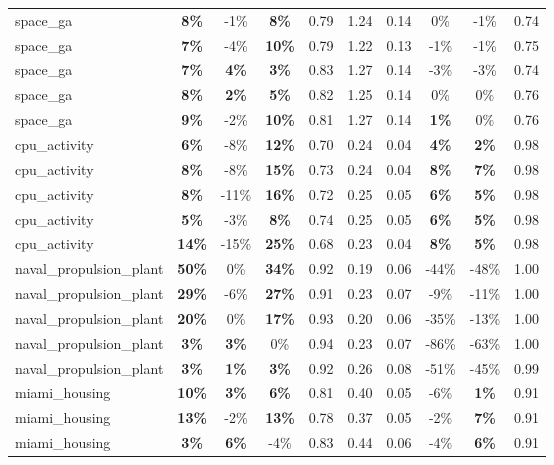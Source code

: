 \begin{table}[!htbp]
\begin{small}
\begin{sc}
{\begin{tabular}{lccccccccc}
space\_ga & \textbf{8\%} & -1\% & \textbf{8\%} & 0.79 & 1.24 & 0.14 & 0\% & -1\% & 0.74 \\
space\_ga & \textbf{7\%} & -4\% & \textbf{10\%} & 0.79 & 1.22 & 0.13 & -1\% & -1\% & 0.75 \\
space\_ga & \textbf{7\%} & \textbf{4\%} & \textbf{3\%} & 0.83 & 1.27 & 0.14 & -3\% & -3\% & 0.74 \\
space\_ga & \textbf{8\%} & \textbf{2\%} & \textbf{5\%} & 0.82 & 1.25 & 0.14 & 0\% & 0\% & 0.76 \\
space\_ga & \textbf{9\%} & -2\% & \textbf{10\%} & 0.81 & 1.27 & 0.14 & \textbf{1\%} & 0\% & 0.76 \\
cpu\_activity & \textbf{6\%} & -8\% & \textbf{12\%} & 0.70 & 0.24 & 0.04 & \textbf{4\%} & \textbf{2\%} & 0.98 \\
cpu\_activity & \textbf{8\%} & -8\% & \textbf{15\%} & 0.73 & 0.24 & 0.04 & \textbf{8\%} & \textbf{7\%} & 0.98 \\
cpu\_activity & \textbf{8\%} & -11\% & \textbf{16\%} & 0.72 & 0.25 & 0.05 & \textbf{6\%} & \textbf{5\%} & 0.98 \\
cpu\_activity & \textbf{5\%} & -3\% & \textbf{8\%} & 0.74 & 0.25 & 0.05 & \textbf{6\%} & \textbf{5\%} & 0.98 \\
cpu\_activity & \textbf{14\%} & -15\% & \textbf{25\%} & 0.68 & 0.23 & 0.04 & \textbf{8\%} & \textbf{5\%} & 0.98 \\
naval\_propulsion\_plant & \textbf{50\%} & 0\% & \textbf{34\%} & 0.92 & 0.19 & 0.06 & -44\% & -48\% & 1.00 \\
naval\_propulsion\_plant & \textbf{29\%} & -6\% & \textbf{27\%} & 0.91 & 0.23 & 0.07 & -9\% & -11\% & 1.00 \\
naval\_propulsion\_plant & \textbf{20\%} & 0\% & \textbf{17\%} & 0.93 & 0.20 & 0.06 & -35\% & -13\% & 1.00 \\
naval\_propulsion\_plant & \textbf{3\%} & \textbf{3\%} & 0\% & 0.94 & 0.23 & 0.07 & -86\% & -63\% & 1.00 \\
naval\_propulsion\_plant & \textbf{3\%} & \textbf{1\%} & \textbf{3\%} & 0.92 & 0.26 & 0.08 & -51\% & -45\% & 0.99 \\
miami\_housing & \textbf{10\%} & \textbf{3\%} & \textbf{6\%} & 0.81 & 0.40 & 0.05 & -6\% & \textbf{1\%} & 0.91 \\
miami\_housing & \textbf{13\%} & -2\% & \textbf{13\%} & 0.78 & 0.37 & 0.05 & -2\% & \textbf{7\%} & 0.91 \\
miami\_housing & \textbf{3\%} & \textbf{6\%} & -4\% & 0.83 & 0.44 & 0.06 & -4\% & \textbf{6\%} & 0.91 \\

\end{tabular}}
\end{sc}
\end{small}
\end{table}
